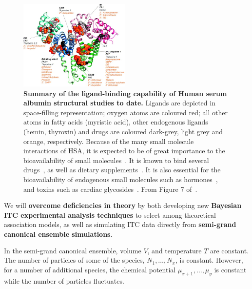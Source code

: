 \documentclass[10pt,final]{article}
\begin{document}
\begin{figure}[H]
	\centering	
	\includegraphics[width=0.49\textwidth]{figures/hsa_fig7_ghuman2005.jpg}
	\caption{\textbf{Summary of the ligand-binding capability of Human serum albumin structural studies to date.} Ligands are depicted in space-filling representation; oxygen atoms are coloured red; all other atoms in fatty acids (myristic acid), other endogenous ligands (hemin, thyroxin) and drugs are coloured dark-grey, light grey and orange, respectively. Because of the many small molecule interactions of HSA, it is expected to be of great importance to the bioavailability of small molecules~\cite{Metcalfe2010a}. It is known to bind several drugs~\cite{SJOeHOLM1979a,Bannwarth1996a,Sulkowska2002a,Ghuman2005a,Perez2007a}, as well as dietary supplements~\cite{Pal2013a}. It is also essential for the bioavailability of endogenous small molecules such as hormones~\cite{Pardridge1986a}, and toxins such as cardiac glycosides~\cite{Smith1985a}. From Figure 7 of~\cite{Ghuman2005a}.
}
	\label{figure:albumin}
\end{figure} 


We will \textbf{overcome deficiencies in theory} by both developing new \textbf{Bayesian ITC experimental analysis techniques} to select among theoretical association models, as well as simulating ITC data directly from \textbf{semi-grand canonical ensemble simulations}.

In the semi-grand canonical ensemble,  volume $V$, and temperature $T$ are constant. The number of particles of some of the species, $N_1,\dots,N_x$, is constant. However, for a number of additional species, the chemical potential $\mu_{x+1},\dots,\mu_{y}$ is constant while the number of particles fluctuates.
\end{document}
